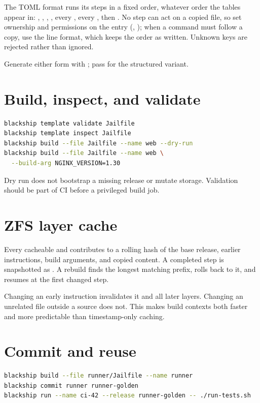 The TOML format runs its steps in a fixed order, whatever order the tables
appear in: , , , ,
every , every , then . No
 step can act on a copied file, so set ownership and permissions
on the  entry (, ); when a command
must follow a copy, use the line format, which keeps the order as written.
Unknown keys are rejected rather than ignored.

Generate either form with ; pass  for
the structured variant.

\section{Build, inspect, and validate}

\begin{lstlisting}[language=bash]
blackship template validate Jailfile
blackship template inspect Jailfile
blackship build --file Jailfile --name web --dry-run
blackship build --file Jailfile --name web \
  --build-arg NGINX_VERSION=1.30
\end{lstlisting}

Dry run does not bootstrap a missing release or mutate storage. Validation
should be part of CI before a privileged build job.

\section{ZFS layer cache}

Every cacheable  and  contributes to a rolling hash
of the base release, earlier instructions, build arguments, and copied content.
A completed step is snapshotted as \command{bs-layer-N-hash}. A rebuild finds
the longest matching prefix, rolls back to it, and resumes at the first changed
step.

Changing an early instruction invalidates it and all later layers. Changing an
unrelated file outside a \command{COPY} source does not. This makes build
contexts both faster and more predictable than timestamp-only caching.

\section{Commit and reuse}

\begin{lstlisting}[language=bash]
blackship build --file runner/Jailfile --name runner
blackship commit runner runner-golden
blackship run --name ci-42 --release runner-golden -- ./run-tests.sh
\end{lstlisting}

